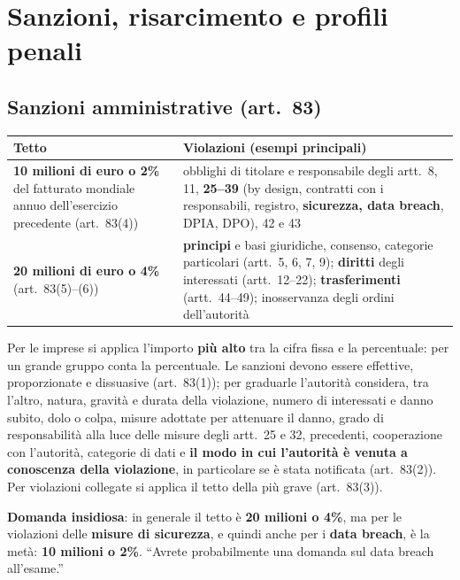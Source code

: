 \section{Sanzioni, risarcimento e profili penali}
\label{sec:gdpr-sanzioni}

\subsection{Sanzioni amministrative (art.~83)}
\begin{center}
\small
\begin{tabularx}{\linewidth}{>{\raggedright\arraybackslash}p{3.8cm} X}
\toprule
\textbf{Tetto} & \textbf{Violazioni (esempi principali)}\\
\midrule
\textbf{10 milioni di euro o 2\%} del fatturato mondiale annuo dell'esercizio precedente (art.~83(4)) &
  obblighi di titolare e responsabile degli artt.~8, 11, \textbf{25--39} (by design, contratti con i
  responsabili, registro, \textbf{sicurezza, data breach}, DPIA, DPO), 42 e 43\\
\textbf{20 milioni di euro o 4\%} (art.~83(5)--(6)) & \textbf{principi} e basi giuridiche, consenso,
  categorie particolari (artt.~5, 6, 7, 9); \textbf{diritti} degli interessati (artt.~12--22);
  \textbf{trasferimenti} (artt.~44--49); inosservanza degli ordini dell'autorità\\
\bottomrule
\end{tabularx}
\end{center}
Per le imprese si applica l'importo \textbf{più alto} tra la cifra fissa e la percentuale: per un grande
gruppo conta la percentuale. Le sanzioni devono essere effettive, proporzionate e dissuasive
(art.~83(1)); per graduarle l'autorità considera, tra l'altro, natura, gravità e durata della violazione,
numero di interessati e danno subito, dolo o colpa, misure adottate per attenuare il danno, grado di
responsabilità alla luce delle misure degli artt.~25 e 32, precedenti, cooperazione con l'autorità,
categorie di dati e \textbf{il modo in cui l'autorità è venuta a conoscenza della violazione}, in
particolare se è stata notificata (art.~83(2)). Per violazioni collegate si applica il tetto della più
grave (art.~83(3)).

\begin{esame}
\textbf{Domanda insidiosa}: in generale il tetto è \textbf{20 milioni o 4\%}, ma per le violazioni delle
\textbf{misure di sicurezza}, e quindi anche per i \textbf{data breach}, è la metà: \textbf{10 milioni o
2\%}. ``Avrete probabilmente una domanda sul data breach all'esame.''
\end{esame}

